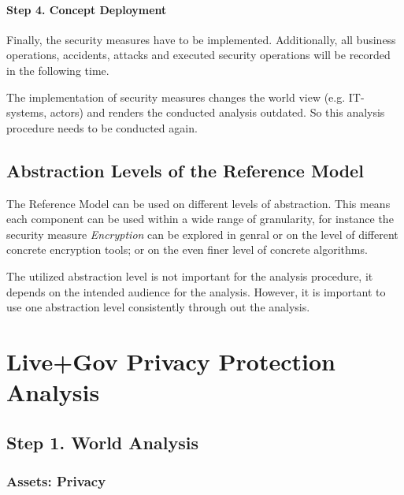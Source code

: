 \paragraph*{Step 4. Concept Deployment}

Finally, the security measures have to be implemented.
Additionally, all business operations, accidents, attacks and executed security operations will be recorded in the following time.

The implementation of security measures changes the world view (e.g. IT-systems, actors) and renders the conducted analysis outdated.
So this analysis procedure needs to be conducted again.

\subsection{Abstraction Levels of the Reference Model}

The Reference Model can be used on different levels of abstraction.
This means each component can be used within a wide range of granularity, for instance the security measure \emph{Encryption} can be explored in genral or on the level of different concrete encryption tools; or on the even finer level of concrete algorithms.

The utilized abstraction level is not important for the analysis procedure, it depends on the intended audience for the analysis.
However, it is important to use one abstraction level consistently through out the analysis.


\pagebreak

\section{Live+Gov Privacy Protection Analysis}

\subsection{Step 1. World Analysis}

\subsubsection{Assets: Privacy}

